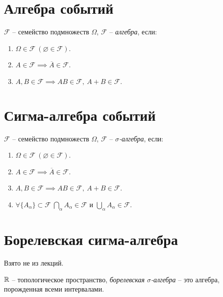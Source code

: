 \section{Алгебра событий}

\begin{definition}[Алгебра]
	$\mathcal{F}$ -- семейство подмножеств $\Omega $, $\mathcal{F}$ -- \emph{алгебра}, если:
	\begin{enumerate}
		\item $\Omega \in \mathcal{F} \ (\varnothing \in \mathcal{F})$.
		\item $A \in \mathcal{F} \implies \overline{A} \in \mathcal{F}$.
		\item $A,B \in \mathcal{F} \implies AB \in \mathcal{F}, \ A + B \in \mathcal{F}$.
	\end{enumerate}
\end{definition}

\section{Сигма-алгебра событий}

\begin{definition}
	$\mathcal{F}$ -- семейство подмножеств $\Omega $, $\mathcal{F}$ -- \emph{$\sigma $-алгебра}, если:
	\begin{enumerate}
		\item $\Omega \in \mathcal{F} \ (\varnothing \in \mathcal{F})$.
		\item $A \in \mathcal{F} \implies \overline{A} \in \mathcal{F}$.
		\item $A,B \in \mathcal{F} \implies AB \in \mathcal{F}, \ A + B \in \mathcal{F}$.
		\item $\forall \{A_{\alpha} \} \subset \mathcal{F} \ \underset{\alpha }{\bigcap} A_{\alpha} \in \mathcal{F} $ и $\underset{\alpha }{\bigcup} A_{\alpha } \in \mathcal{F}$.
	\end{enumerate}
\end{definition}

\section{Борелевская сигма-алгебра}

\begin{note}
	Взято не из лекций.
\end{note}

\begin{definition}
	$\mathbb{R}$ -- топологическое пространство, \emph{борелевская $\sigma $-алгебра} -- это алгебра, порожденная всеми интервалами.
\end{definition}

